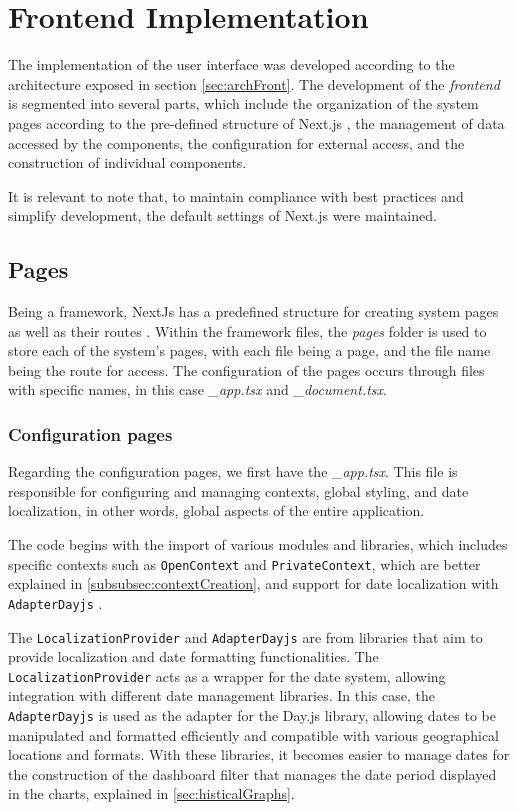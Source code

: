 \section[Frontend Implementation]{Frontend Implementation}\label{sec:implFront}

The implementation of the user interface was developed according to the architecture exposed in section \ref{sec:archFront}. The development of the \textit{frontend} is segmented into several parts, which include the organization of the system pages according to the pre-defined structure of Next.js \cite{nextjsDocs}, the management of data accessed by the components, the configuration for external access, and the construction of individual components.

It is relevant to note that, to maintain compliance with best practices and simplify development, the default settings of Next.js were maintained.

\subsection{Pages}\label{subsec:pages}
Being a framework, NextJs has a predefined structure for creating system pages as well as their routes \cite{nextjsDefiningRoutes}. Within the framework files, the \textit{pages} folder is used to store each of the system's pages, with each file being a page, and the file name being the route for access. The configuration of the pages occurs through files with specific names, in this case \textit{\_app.tsx} and \textit{\_document.tsx}.

\subsubsection{Configuration pages}\label{subsec:configPage}
Regarding the configuration pages, we first have the \textit{\_app.tsx}. This file is responsible for configuring and managing contexts, global styling, and date localization, in other words, global aspects of the entire application.

The code begins with the import of various modules and libraries, which includes specific contexts such as \texttt{OpenContext} and \texttt{PrivateContext}, which are better explained in \ref{subsubsec:contextCreation}, and support for date localization with \texttt{AdapterDayjs} \cite{dayJsInstallation}.

The \texttt{LocalizationProvider} and \texttt{AdapterDayjs} are from libraries that aim to provide localization and date formatting functionalities. The \texttt{LocalizationProvider} acts as a wrapper for the date system, allowing integration with different date management libraries. In this case, the \texttt{AdapterDayjs} is used as the adapter for the Day.js library, allowing dates to be manipulated and formatted efficiently and compatible with various geographical locations and formats. With these libraries, it becomes easier to manage dates for the construction of the dashboard filter that manages the date period displayed in the charts, explained in \ref{sec:histicalGraphs}.

